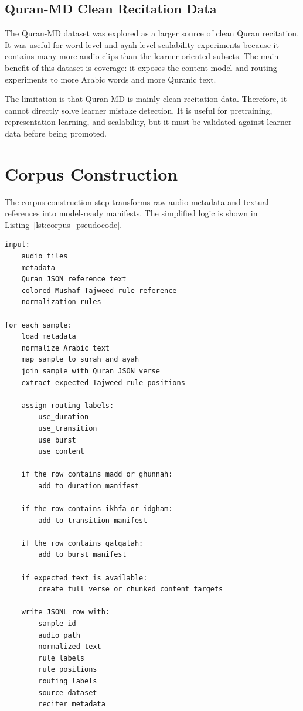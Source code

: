 \documentclass[12pt,a4paper]{report}
\begin{document}
\subsection{Quran-MD Clean Recitation Data}

The Quran-MD dataset was explored as a larger source of clean Quran recitation.
It was useful for word-level and ayah-level scalability experiments because it
contains many more audio clips than the learner-oriented subsets. The main
benefit of this dataset is coverage: it exposes the content model and routing
experiments to more Arabic words and more Quranic text.

The limitation is that Quran-MD is mainly clean recitation data. Therefore, it
cannot directly solve learner mistake detection. It is useful for pretraining,
representation learning, and scalability, but it must be validated against
learner data before being promoted.

\section{Corpus Construction}

The corpus construction step transforms raw audio metadata and textual
references into model-ready manifests. The simplified logic is shown in
Listing~\ref{lst:corpus_pseudocode}.

\begin{lstlisting}[caption={Simplified pseudocode for corpus construction.},label={lst:corpus_pseudocode}]
input:
    audio files
    metadata
    Quran JSON reference text
    colored Mushaf Tajweed rule reference
    normalization rules

for each sample:
    load metadata
    normalize Arabic text
    map sample to surah and ayah
    join sample with Quran JSON verse
    extract expected Tajweed rule positions

    assign routing labels:
        use_duration
        use_transition
        use_burst
        use_content

    if the row contains madd or ghunnah:
        add to duration manifest

    if the row contains ikhfa or idgham:
        add to transition manifest

    if the row contains qalqalah:
        add to burst manifest

    if expected text is available:
        create full verse or chunked content targets

    write JSONL row with:
        sample id
        audio path
        normalized text
        rule labels
        rule positions
        routing labels
        source dataset
        reciter metadata
\end{lstlisting}
\end{document}
